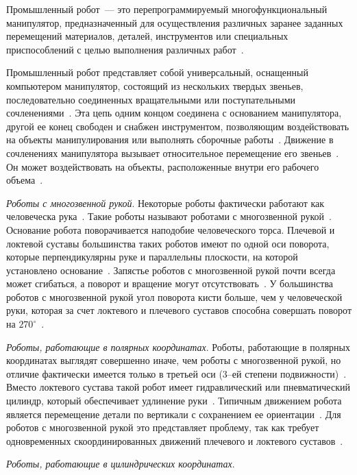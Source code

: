 \documentclass[oneside, final, 14pt]{extarticle}
\begin{document}
Промышленный робот~--- это перепрограммируемый многофункциональный манипулятор, предназначенный для осуществления различных заранее заданных перемещений материалов, деталей, инструментов или специальных приспособлений с целью выполнения различных работ~\cite{fu:rob_tech}.
\par
Промышленный робот представляет собой универсальный, оснащенный компьютером манипулятор, состоящий из нескольких твердых звеньев, последовательно соединенных вращательными или поступательными сочленениями~\cite{fu:rob_tech}.
Эта цепь одним концом соединена с основанием манипулятора, другой ее конец свободен и снабжен инструментом, позволяющим воздействовать на объекты манипулирования или выполнять сборочные работы~\cite{fu:rob_tech}.
Движение в сочленениях манипулятора вызывает относительное перемещение его звеньев~\cite{fu:rob_tech}.
Он может воздействовать на объекты, расположенные внутри его рабочего объема~\cite{fu:rob_tech}.
\par
{\itshape Роботы с многозвенной рукой}.
Некоторые роботы фактически работают как человеческа рука~\cite{asfal:rob_auto}.
Такие роботы называют роботами с многозвенной рукой~\cite{asfal:rob_auto}.
Основание робота поворачивается наподобие человеческого торса.
Плечевой и локтевой суставы большинства таких роботов имеют по одной оси поворота, которые перпендикулярны руке и параллельны плоскости, на которой установлено основание~\cite{asfal:rob_auto}.
Запястье роботов с многозвенной рукой почти всегда может сгибаться, а поворот и вращение могут отсутствовать~\cite{asfal:rob_auto}.
У большинства роботов с многозвенной рукой угол поворота кисти больше, чем у человеческой руки, которая за счет локтевого и плечевого суставов способна совершать поворот на \(270^\circ\)~\cite{asfal:rob_auto}. 
\par
{\itshape Роботы, работающие в полярных координатах}.
Роботы, работающие в полярных координатах выглядят совершенно иначе, чем роботы с многозвенной рукой, но отличие фактически имеется только в третьей оси (3--ей степени подвижности)~\cite{asfal:rob_auto}.
Вместо локтевого сустава такой робот имеет гидравлический или пневматический цилиндр, который обеспечивает удлинение руки~\cite{asfal:rob_auto}.
Типичным  движением робота является перемещение детали по вертикали с сохранением ее ориентации~\cite{asfal:rob_auto}.
Для роботов с многозвенной рукой это представляет проблему, так как требует одновременных скоординированных движений плечевого и локтевого суставов~\cite{asfal:rob_auto}.
\par
{\itshape Роботы, работающие в цилиндрических координатах}.
\end{document}
